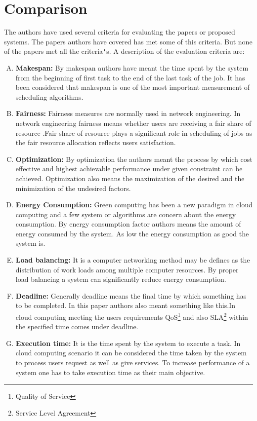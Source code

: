 \documentclass{report}
\begin{document}
\chapter{Comparison}
The authors have used several criteria for evaluating the papers or proposed systems. The papers authors have covered has met some of this criteria. But none of the papers met all the criteria\verb|'|s.
A description of the evaluation criteria are:
\\
\begin{enumerate}[A.]

\item \textbf{Makespan:} By makespan authors have  meant the time spent by the system from the beginning of  first task to the end of the last task of the job. It has been considered that makespan is one of the most important measurement of scheduling algorithms.
\item \textbf{Fairness:} Fairness  measures are normally used in network engineering. In network engineering fairness means whether  users are receiving a fair share of resource .Fair share  of resource plays a significant role in scheduling of jobs as the fair resource allocation reflects users satisfaction.
\item \textbf{Optimization:} By optimization the authors meant the process by which  cost effective and highest achievable performance under given constraint can be achieved. Optimization also means the maximization of the desired and the minimization of the undesired factors.
\item \textbf{Energy Consumption:} Green computing has been a new paradigm in cloud computing and a few system or algorithms are concern about the energy consumption. By energy consumption factor authors means the amount of energy consumed by the system. As  low the energy consumption as good the system is.
\item \textbf{Load balancing:} It is a computer networking method may be defines as the distribution of work loads among multiple computer resources. By proper load balancing a system can significantly reduce energy consumption.
\item \textbf{Deadline:} Generally deadline means the final time by which something has to be completed. In this paper authors also meant something like this.In cloud computing meeting the users requirements QoS\footnote{Quality of Service} and also SLA\footnote{Service Level Agreement} within the specified time comes under deadline.
\item \textbf{Execution time:} It is the time spent by the system to execute a task. In cloud computing scenario it can be considered the time taken by the system to process users request as well as give services. To increase performance of a system one has to take  execution time as their main objective.
\end{enumerate}
\end{document}
